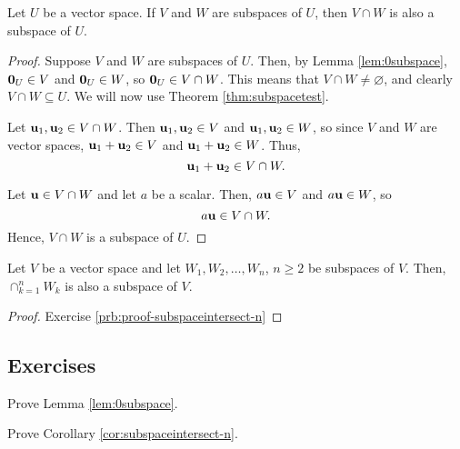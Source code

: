 \begin{theorem}\label{thm:subspaceintersect-2}
Let $ U $ be a vector space. If $ V $ and $ W $ are subspaces of $ U $, then $ V\cap W $ is also a subspace of $ U $.
\end{theorem}
\begin{proof}
Suppose $ V $ and $ W $ are subspaces of $ U $. Then, by Lemma \ref{lem:0subspace}, $ \mathbf{0}_U\in V $ and $ \mathbf{0}_U\in W $, so $ \mathbf{0}_U\in V\cap W $. This means that $ V\cap W\neq\varnothing $, and clearly $ V\cap W\subseteq U $. We will now use Theorem \ref{thm:subspacetest}.

Let $ \mathbf{u}_1,\mathbf{u}_2\in V\cap W $. Then $ \mathbf{u}_1,\mathbf{u}_2\in V $ and $ \mathbf{u}_1,\mathbf{u}_2\in W $, so since $ V $ and $ W $ are vector spaces, $ \mathbf{u}_1+\mathbf{u}_2\in V $ and $ \mathbf{u}_1+\mathbf{u}_2\in W $. Thus,
\begin{equation*}
    \mathbf{u}_1+\mathbf{u}_2\in V\cap W.
\end{equation*}

Let $ \mathbf{u}\in V\cap W $ and let $ a $ be a scalar. Then, $ a\mathbf{u}\in V $ and $ a\mathbf{u}\in W $, so
\begin{equation*}
    a\mathbf{u}\in V\cap W.
\end{equation*}
Hence, $ V\cap W $ is a subspace of $ U $.
\end{proof}

\begin{corollary}\label{cor:subspaceintersect-n}
Let $ V $ be a vector space and let $ W_1,W_2,\ldots,W_n $, $ n\geq 2 $ be subspaces of $ V $. Then, $ \cap_{k=1}^n W_k $ is also a subspace of $ V $.
\end{corollary}
\begin{proof}
Exercise \ref{prb:proof-subspaceintersect-n}\noqed
\end{proof}

\subsection*{Exercises}

\begin{problem}\label{prb:proof-0subspace}
Prove Lemma \ref{lem:0subspace}.
\end{problem}

\begin{problem}\label{prb:proof-subspaceintersect-n}
Prove Corollary \ref{cor:subspaceintersect-n}.
\end{problem}


